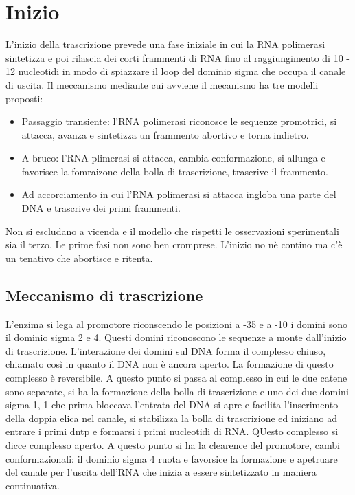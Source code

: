 \section{Inizio}
L'inizio della trascrizione prevede una fase iniziale in cui la RNA polimerasi sintetizza e poi rilascia dei corti frammenti di RNA fino al raggiungimento di 10 - 12 nucleotidi in modo 
di spiazzare il loop del dominio sigma che occupa il canale di uscita. Il meccanismo mediante cui avviene il mecanismo ha tre modelli proposti:
\begin{itemize}
	\item Passaggio transiente: l'RNA polimerasi riconosce le sequenze promotrici, si attacca, avanza e sintetizza un frammento abortivo e torna indietro.
	\item A bruco: l'RNA plimerasi si attacca, cambia conformazione, si allunga e favorisce la fomraizone della bolla di trascrizione, trascrive il frammento.
	\item Ad accorciamento in cui l'RNA polimerasi si attacca ingloba una parte del DNA e trascrive dei primi frammenti.
\end{itemize}
Non si escludano a vicenda e il modello che rispetti le osservazioni sperimentali sia il terzo. Le prime fasi non sono ben cromprese. L'inizio no n\`e contino ma c'\`e un tenativo che 
abortisce e ritenta.
\subsection{Meccanismo di trascrizione}
L'enzima si lega al promotore riconscendo le posizioni a -35 e a -10 i domini sono il dominio sigma 2 e 4. Questi domini riconoscono le sequenze a monte dall'inizio di trascrizione. 
L'interazione dei domini sul DNA forma il complesso chiuso, chiamato cos\`i in quanto il DNA non \`e ancora aperto. La formazione di questo complesso \`e reversibile. A questo punto
si passa al complesso in cui le due catene sono separate, si ha la formazione della bolla di trascrizione e uno dei due domini sigma 1, 1 che prima bloccava l'entrata del DNA si apre
e facilita l'inserimento della doppia elica nel canale, si stabilizza la bolla di trascrizione ed iniziano ad entrare i primi dntp e formarsi i primi nucleotidi di RNA. QUesto complesso
si dicce complesso aperto. A questo punto si ha la clearence del promotore, cambi conformazionali: il dominio sigma 4 ruota e favorsice la formazione e apetruare del canale per l'uscita
dell'RNA che inizia a essere sintetizzato in maniera continuativa. 
